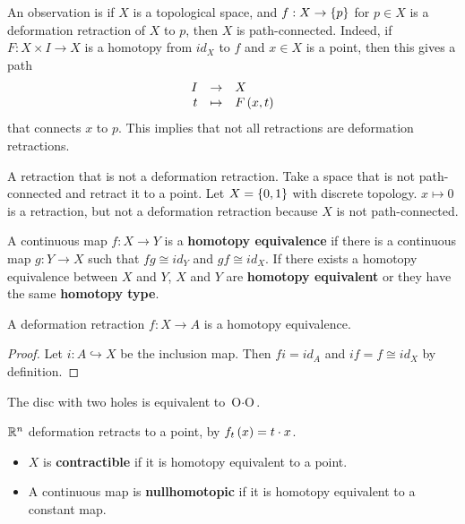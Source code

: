 An observation is if $ X $ is a topological space, and $ f : X \to \left\{ p \right\} $ for $ p \in X $ is a deformation retraction of $ X $ to $ p $, then $ X $ is path-connected. Indeed, if $ F : X \times I \to X $ is a homotopy from $ id_X $ to $ f $ and $ x \in X $ is a point, then this gives a path
$$ \function{I}{X}{t}{F\rb{x, t}} $$
that connects $ x $ to $ p $. This implies that not all retractions are deformation retractions.

\begin{example*}
A retraction that is not a deformation retraction. Take a space that is not path-connected and retract it to a point. Let $ X = \left\{ 0, 1 \right\} $ with discrete topology. $ x \mapsto 0 $ is a retraction, but not a deformation retraction because $ X $ is not path-connected.
\end{example*}

\begin{definition*}
A continuous map $ f : X \to Y $ is a \textbf{homotopy equivalence} if there is a continuous map $ g : Y \to X $ such that $ fg \cong id_Y $ and $ gf \cong id_X $. If there exists a homotopy equivalence between $ X $ and $ Y $, $ X $ and $ Y $ are \textbf{homotopy equivalent} or they have the same \textbf{homotopy type}.
\end{definition*}

\begin{lemma}
A deformation retraction $ f : X \to A $ is a homotopy equivalence.
\end{lemma}

\begin{proof}
Let $ i : A \hookrightarrow X $ be the inclusion map. Then $ fi = id_A $ and $ if = f \cong id_X $ by definition.
\end{proof}

\begin{example*}
The disc with two holes is equivalent to $ \text{O} \cdot \text{O} $.
\end{example*}

\begin{example*}
$ \mathbb{R}^n $ deformation retracts to a point, by $ f_t\left( x \right) = t \cdot x $.
\end{example*}

\begin{definition*}
\hfill
\begin{itemize}
\item $ X $ is \textbf{contractible} if it is homotopy equivalent to a point.
\item A continuous map is \textbf{nullhomotopic} if it is homotopy equivalent to a constant map.
\end{itemize}
\end{definition*}

